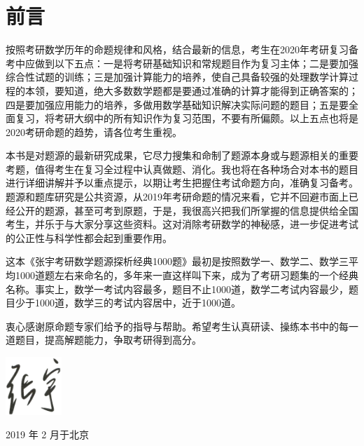 	\onecolumn
	\chapter{前言}

	按照考研数学历年的命题规律和风格，结合最新的信息，考生在2020年考研复习备考中应做到以下五点：一是将考研基础知识和常规题目作为复习主体；二是要加强综合性试题的训练；三是加强计算能力的培养，使自己具备较强的处理数学计算过程的本领，要知道，绝大多数数学题都是要通过准确的计算才能得到正确答案的；四是要加强应用能力的培养，多做用数学基础知识解决实际问题的题目；五是要全面复习，将考研大纲中的所有知识作为复习范围，不要有所偏颇。以上五点也将是2020考研命题的趋势，请各位考生重视。

	本书是对题源的最新研究成果，它尽力搜集和命制了题源本身或与题源相关的重要考题，值得考生在复习全过程中认真做题、消化。我也将在各种场合对本书的题目进行详细讲解并予以重点提示，以期让考生把握住考试命题方向，准确复习备考。题源和题库研究是公共资源，从2019年考研命题的情况来看，它并不回避市面上已经公开的题源，甚至可考到原题，于是，我很高兴把我们所掌握的信息提供给全国考生，并乐于与大家分享这些资料。这对消除考研数学的神秘感，进一步促进考试的公正性与科学性都会起到重要作用。

	这本《张宇考研数学题源探析经典1000题》最初是按照数学一、数学二、数学三平均1000道题左右来命名的，多年来一直这样叫下来，成为了考研习题集的一个经典名称。事实上，数学一考试内容最多，题目不止1000道，数学二考试内容最少，题目少于1000道，数学三的考试内容居中，近于1000道。

	衷心感谢原命题专家们给予的指导与帮助。希望考生认真研读、操练本书中的每一道题目，提高解题能力，争取考研得到高分。

	\phantom{1}\hspace{\fill} {\includegraphics[width=5pc]{figure/fig0.png}}
	
	\phantom{1}\hspace{\fill} {2019 年 2 月\quad 于北京}
	\twocolumn